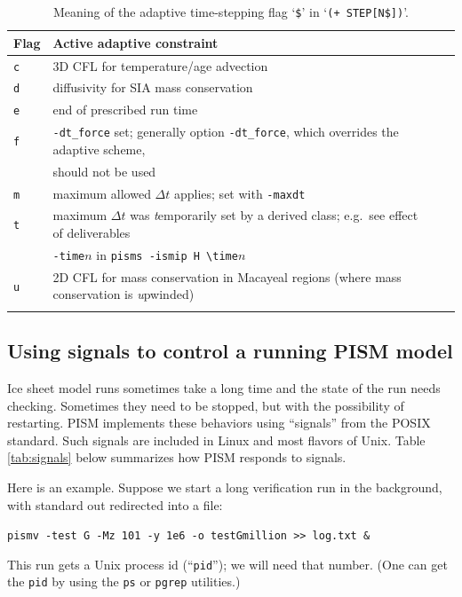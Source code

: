 \documentclass[11pt,final]{amsart}
\begin{document}
\begin{table}[h]
\caption{Meaning of the adaptive time-stepping flag `\texttt{\$}' in `\texttt{(+    STEP[N\$])}'.}\label{tab:adaptiveflag}
\begin{tabular}{@{}llll}\hline
\textbf{Flag} & \textbf{Active adaptive constraint} \\ \hline
\verb|c| & 3D CFL for temperature/age advection \cite{BBL} \\
\verb|d| & diffusivity for SIA mass conservation \cite{BBL} \\
\verb|e| & end of prescribed run time \\
\verb|f| & \verb|-dt_force| set; generally option \verb|-dt_force|, which overrides the adaptive scheme, \\
 & should not be used  \\
\verb|m| & maximum allowed $\Delta t$ applies; set with \verb|-maxdt| \\
\verb|t| & maximum $\Delta t$ was \emph{t}emporarily set by a derived class; e.g.~see effect of deliverables \\
 & \verb|-time|$n$ in \verb|pisms -ismip H \time|$n$ \\
\verb|u| & 2D CFL for mass conservation in Macayeal regions (where mass conservation is \emph{u}pwinded)\\
\hline
\normalsize
\end{tabular}
\end{table}

\subsection{Using signals to control a running PISM model} \label{subsect:signal}  Ice sheet model runs sometimes take a long time and the state of the run needs checking.  Sometimes they need to be stopped, but with the possibility of restarting.  PISM implements these behaviors using ``signals'' from the POSIX standard.  Such signals are included in Linux and most flavors of Unix.  Table \ref{tab:signals} below summarizes how PISM responds to signals.

Here is an example.  Suppose we start a long verification run in the background, with standard out redirected into a file:

\verb|pismv -test G -Mz 101 -y 1e6 -o testGmillion >> log.txt &|

\noindent This run gets a Unix process id (``\verb|pid|''); we will need that number.  (One can get the \verb|pid| by using the \verb|ps| or \verb|pgrep| utilities.)
\end{document}

